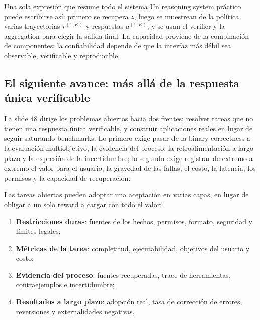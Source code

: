 \begin{importantbox}{Una sola expresión que resume todo el sistema}
Un reasoning system práctico puede escribirse así: primero se recupera $z$, luego se muestrean de la política varias trayectorias $r^{(1:K)}$ y respuestas $a^{(1:K)}$, y se usan el verifier y la aggregation para elegir la salida final. La capacidad proviene de la combinación de componentes; la confiabilidad depende de que la interfaz más débil sea observable, verificable y reproducible.
\end{importantbox}

\subsection{El siguiente avance: más allá de la respuesta única verificable}

La slide 48 dirige los problemas abiertos hacia dos frentes: resolver tareas que no tienen una respuesta única verificable, y construir aplicaciones reales en lugar de seguir saturando benchmarks. Lo primero exige pasar de la binary correctness a la evaluación multiobjetivo, la evidencia del proceso, la retroalimentación a largo plazo y la expresión de la incertidumbre; lo segundo exige registrar de extremo a extremo el valor para el usuario, la gravedad de las fallas, el costo, la latencia, los permisos y la capacidad de recuperación.



Las tareas abiertas pueden adoptar una aceptación en varias capas, en lugar de obligar a un solo reward a cargar con todo el valor:
\begin{enumerate}
  \item \textbf{Restricciones duras}: fuentes de los hechos, permisos, formato, seguridad y límites legales;
  \item \textbf{Métricas de la tarea}: completitud, ejecutabilidad, objetivos del usuario y costo;
  \item \textbf{Evidencia del proceso}: fuentes recuperadas, trace de herramientas, contraejemplos e incertidumbre;
  \item \textbf{Resultados a largo plazo}: adopción real, tasa de corrección de errores, reversiones y externalidades negativas.
\end{enumerate}

